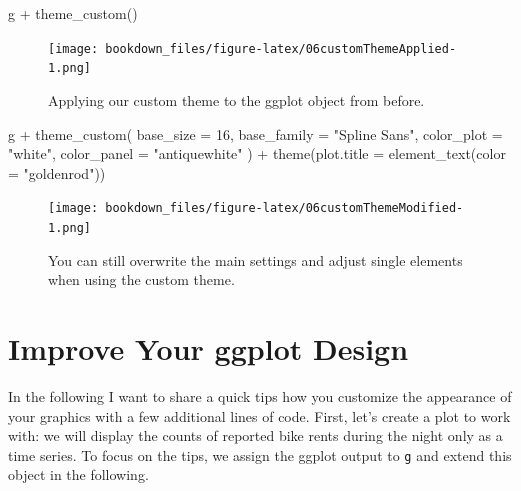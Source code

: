 \documentclass[
]{krantz}
\makeatletter
\newenvironment{Shaded}{\begin{snugshade}}{\end{snugshade}}
\newcommand{\AttributeTok}[1]{\textcolor[rgb]{0.61,0.61,0.61}{#1}}
\newcommand{\DecValTok}[1]{\textcolor[rgb]{0.06,0.06,0.06}{#1}}
\newcommand{\FunctionTok}[1]{\textcolor[rgb]{0,0,0}{#1}}
\newcommand{\NormalTok}[1]{#1}
\newcommand{\SpecialCharTok}[1]{\textcolor[rgb]{0,0,0}{#1}}
\newcommand{\StringTok}[1]{\textcolor[rgb]{0.5,0.5,0.5}{#1}}
\newenvironment{kframe}{%
\medskip{}
\setlength{\fboxsep}{.8em}
 \def\at@end@of@kframe{}%
 \ifinner\ifhmode%
  \def\at@end@of@kframe{\end{minipage}}%
  \begin{minipage}{\columnwidth}%
 \fi\fi%
 \def\FrameCommand##1{\hskip\@totalleftmargin \hskip-\fboxsep
 \colorbox{shadecolor}{##1}\hskip-\fboxsep
     \hskip-\linewidth \hskip-\@totalleftmargin \hskip\columnwidth}%
 \MakeFramed {\advance\hsize-\width
   \@totalleftmargin\z@ \linewidth\hsize
   \@setminipage}}%
 {\par\unskip\endMakeFramed%
 \at@end@of@kframe}
\renewenvironment{Shaded}{\begin{kframe}}{\end{kframe}}
\makeatother
\begin{document}
\begin{Shaded}
\begin{Highlighting}[]
\NormalTok{g }\SpecialCharTok{+} \FunctionTok{theme\_custom}\NormalTok{()}
\end{Highlighting}
\end{Shaded}

\begin{figure}
\centering
\texttt{[image: bookdown\_files/figure-latex/06customThemeApplied-1.png]}
\caption{\label{fig:06customThemeApplied}Applying our custom theme to the ggplot object from before.}
\end{figure}

\begin{Shaded}
\begin{Highlighting}[]
\NormalTok{g }\SpecialCharTok{+}
  \FunctionTok{theme\_custom}\NormalTok{(}
    \AttributeTok{base\_size =} \DecValTok{16}\NormalTok{, }\AttributeTok{base\_family =} \StringTok{"Spline Sans"}\NormalTok{,}
    \AttributeTok{color\_plot =} \StringTok{"white"}\NormalTok{, }\AttributeTok{color\_panel =} \StringTok{"antiquewhite"}
\NormalTok{  ) }\SpecialCharTok{+}
  \FunctionTok{theme}\NormalTok{(}\AttributeTok{plot.title =} \FunctionTok{element\_text}\NormalTok{(}\AttributeTok{color =} \StringTok{"goldenrod"}\NormalTok{))}
\end{Highlighting}
\end{Shaded}

\begin{figure}
\centering
\texttt{[image: bookdown\_files/figure-latex/06customThemeModified-1.png]}
\caption{\label{fig:06customThemeModified}You can still overwrite the main settings and adjust single elements when using the custom theme.}
\end{figure}

\hypertarget{improve-your-ggplot-design}{%
\section{Improve Your ggplot Design}\label{improve-your-ggplot-design}}

In the following I want to share a quick tips how you customize the appearance of your graphics with a few additional lines of code. First, let's create a plot to work with: we will display the counts of reported bike rents during the night only as a time series. To focus on the tips, we assign the ggplot output to \texttt{g} and extend this object in the following.
\end{document}
